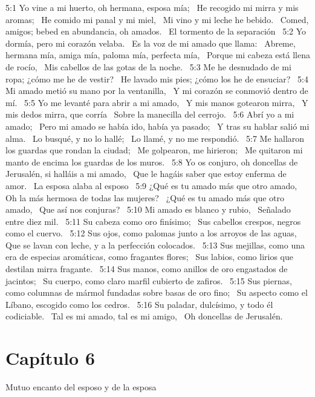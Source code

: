 5:1 Yo vine a mi huerto, oh hermana, esposa mía;  
He recogido mi mirra y mis aromas;  
He comido mi panal y mi miel,  
Mi vino y mi leche he bebido.  
Comed, amigos; bebed en abundancia, oh amados.  
El tormento de la separación  
5:2 Yo dormía, pero mi corazón velaba.  
Es la voz de mi amado que llama:  
Abreme, hermana mía, amiga mía, paloma mía, perfecta mía,  
Porque mi cabeza está llena de rocío,  
Mis cabellos de las gotas de la noche.  
5:3 Me he desnudado de mi ropa; ¿cómo me he de vestir?  
He lavado mis pies; ¿cómo los he de ensuciar?  
5:4 Mi amado metió su mano por la ventanilla,  
Y mi corazón se conmovió dentro de mí.  
5:5 Yo me levanté para abrir a mi amado,  
Y mis manos gotearon mirra,  
Y mis dedos mirra, que corría  
Sobre la manecilla del cerrojo.  
5:6 Abrí yo a mi amado;  
Pero mi amado se había ido, había ya pasado;  
Y tras su hablar salió mi alma.  
Lo busqué, y no lo hallé;  
Lo llamé, y no me respondió.  
5:7 Me hallaron los guardas que rondan la ciudad;  
Me golpearon, me hirieron;  
Me quitaron mi manto de encima los guardas de los muros.  
5:8 Yo os conjuro, oh doncellas de Jerusalén, si halláis a mi amado,  
Que le hagáis saber que estoy enferma de amor.  
La esposa alaba al esposo  
5:9 ¿Qué es tu amado más que otro amado,  
Oh la más hermosa de todas las mujeres?  
¿Qué es tu amado más que otro amado,  
Que así nos conjuras?  
5:10 Mi amado es blanco y rubio,  
Señalado entre diez mil.  
5:11 Su cabeza como oro finísimo;  
Sus cabellos crespos, negros como el cuervo.  
5:12 Sus ojos, como palomas junto a los arroyos de las aguas,  
Que se lavan con leche, y a la perfección colocados.  
5:13 Sus mejillas, como una era de especias aromáticas, como fragantes flores;  
Sus labios, como lirios que destilan mirra fragante.  
5:14 Sus manos, como anillos de oro engastados de jacintos;  
Su cuerpo, como claro marfil cubierto de zafiros.  
5:15 Sus piernas, como columnas de mármol fundadas sobre basas de oro fino;  
Su aspecto como el Líbano, escogido como los cedros.  
5:16 Su paladar, dulcísimo, y todo él codiciable.  
Tal es mi amado, tal es mi amigo,  
Oh doncellas de Jerusalén.  
\section*{Capítulo 6}
Mutuo encanto del esposo y de la esposa  

